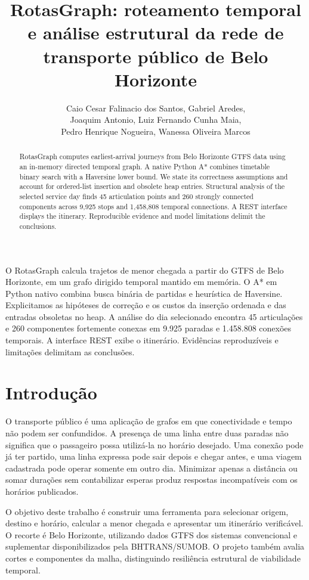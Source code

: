 \documentclass[12pt]{article}
\title{RotasGraph: roteamento temporal e análise estrutural da rede de transporte público de Belo Horizonte}
\author{Caio Cesar Falinacio dos Santos\inst{1}, Gabriel Aredes\inst{1},\\
Joaquim Antonio\inst{1}, Luiz Fernando Cunha Maia\inst{1},\\
Pedro Henrique Nogueira\inst{1}, Wanessa Oliveira Marcos\inst{1}}
\begin{document}
\maketitle
\begin{abstract}
RotasGraph computes earliest-arrival journeys from Belo Horizonte GTFS data using an in-memory directed temporal graph. A native Python A* combines timetable binary search with a Haversine lower bound. We state its correctness assumptions and account for ordered-list insertion and obsolete heap entries. Structural analysis of the selected service day finds 45 articulation points and 260 strongly connected components across 9,925 stops and 1,458,808 temporal connections. A REST interface displays the itinerary. Reproducible evidence and model limitations delimit the conclusions.
\end{abstract}
\begin{resumo}
O RotasGraph calcula trajetos de menor chegada a partir do GTFS de Belo Horizonte, em um grafo dirigido temporal mantido em memória. O A* em Python nativo combina busca binária de partidas e heurística de Haversine. Explicitamos as hipóteses de correção e os custos da inserção ordenada e das entradas obsoletas no heap. A análise do dia selecionado encontra 45 articulações e 260 componentes fortemente conexas em 9.925 paradas e 1.458.808 conexões temporais. A interface REST exibe o itinerário. Evidências reproduzíveis e limitações delimitam as conclusões.
\end{resumo}

\section{Introdução}
O transporte público é uma aplicação de grafos em que conectividade e tempo não podem ser confundidos. A presença de uma linha entre duas paradas não significa que o passageiro possa utilizá-la no horário desejado. Uma conexão pode já ter partido, uma linha expressa pode sair depois e chegar antes, e uma viagem cadastrada pode operar somente em outro dia. Minimizar apenas a distância ou somar durações sem contabilizar esperas produz respostas incompatíveis com os horários publicados.

O objetivo deste trabalho é construir uma ferramenta para selecionar origem, destino e horário, calcular a menor chegada e apresentar um itinerário verificável. O recorte é Belo Horizonte, utilizando dados GTFS dos sistemas convencional e suplementar disponibilizados pela BHTRANS/SUMOB. O projeto também avalia cortes e componentes da malha, distinguindo resiliência estrutural de viabilidade temporal.
\end{document}
